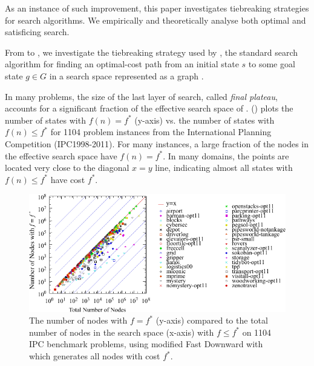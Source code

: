As an instance of such improvement, this paper investigates tiebreaking
strategies for search algorithms. We empirically and theoretically
analyse both optimal and satisficing search.


From  to , we investigate
the tiebreaking strategy used by \astar, the standard search algorithm
for finding an optimal-cost path from an initial state $s$ to some goal
state $g \in G$ in a search space represented as a graph
\cite{hart1968formal}. 

In many problems, the size of the last layer of search, called
\emph{final plateau}, accounts for a significant fraction of
the effective search space of \astar.  
() plots the
number of states with $f(n) = f^*$ (y-axis) vs. the number of states with
$f(n) \leq f^*$ for 1104 problem instances from the International
Planning Competition (IPC1998-2011).  For many instances, a large
fraction of the nodes in the effective search space have $f(n)=f^*$.
In many domains, the points are located very close to the diagonal $x=y$
line, indicating almost all states with $f(n) \leq f^*$ have cost $f^*$.



\begin{figure}[htbp]
  \centering
  \includegraphics{tables/aaai16-frontier/aaai16prelim3/lmcut_frontier_noh-front.pdf}
 \caption{
 The number of nodes with $f=f^*$ (y-axis) compared to the
 total number of nodes in the search space (x-axis) with $f\leq f^*$ on 1104 IPC benchmark problems,
  using modified Fast Downward with \lmcut which 
  generates all nodes with cost $f^*$.
  }
 \label{fig:plateau-noh}
\end{figure}

